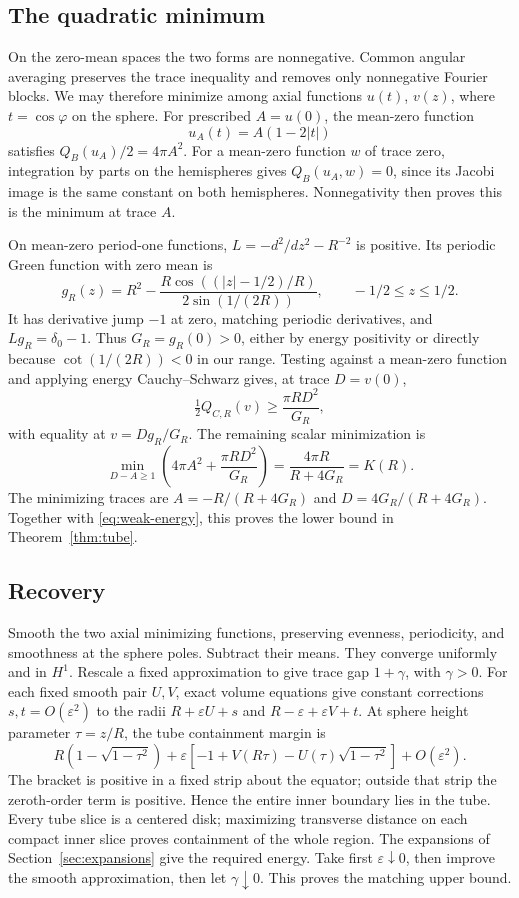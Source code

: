 \documentclass[11pt,reqno]{amsart}
\numberwithin{equation}{section}
\theoremstyle{definition}
\theoremstyle{remark}
\newcommand{\eps}{\varepsilon}
\begin{document}
\subsection{The quadratic minimum}
On the zero-mean spaces the two forms are nonnegative.
Common angular averaging preserves the trace inequality and removes
only nonnegative Fourier blocks. We may therefore minimize among
axial functions $u(t)$, $v(z)$, where $t=\cos\varphi$ on the sphere.
For prescribed $A=u(0)$, the mean-zero function
\[
 u_A(t)=A(1-2|t|)
\]
satisfies $Q_B(u_A)/2=4\pi A^2$.
For a mean-zero function $w$ of trace zero, integration by parts on
the hemispheres gives $Q_B(u_A,w)=0$, since its Jacobi image is the
same constant on both hemispheres. Nonnegativity then proves this is
the minimum at trace $A$.

On mean-zero period-one functions, $L=-d^2/dz^2-R^{-2}$ is positive.
Its periodic Green function with zero mean is
\[
 g_R(z)=R^2-\frac{R\cos((|z|-1/2)/R)}{2\sin(1/(2R))},
 \qquad -1/2\le z\le1/2.
\]
It has derivative jump $-1$ at zero, matching periodic derivatives,
and $Lg_R=\delta_0-1$. Thus $G_R=g_R(0)>0$, either by energy
positivity or directly because $\cot(1/(2R))<0$ in our range.
Testing against a mean-zero function and applying energy
Cauchy--Schwarz gives, at trace $D=v(0)$,
\[
 \tfrac12Q_{C,R}(v)\ge\frac{\pi R D^2}{G_R},
\]
with equality at $v=Dg_R/G_R$. The remaining scalar minimization is
\[
 \min_{D-A\ge1}\left(4\pi A^2+\frac{\pi R D^2}{G_R}\right)
 =\frac{4\pi R}{R+4G_R}=K(R).
\]
The minimizing traces are $A=-R/(R+4G_R)$ and
$D=4G_R/(R+4G_R)$. Together with \eqref{eq:weak-energy}, this proves
the lower bound in Theorem~\ref{thm:tube}.

\subsection{Recovery}
Smooth the two axial minimizing functions, preserving evenness,
periodicity, and smoothness at the sphere poles. Subtract their means.
They converge uniformly and in $H^1$. Rescale a fixed approximation
to give trace gap $1+\gamma$, with $\gamma>0$.
For each fixed smooth pair $U,V$, exact volume equations give constant
corrections $s,t=O(\eps^2)$ to the radii
$R+\eps U+s$ and $R-\eps+\eps V+t$.
At sphere height parameter $\tau=z/R$, the tube containment margin is
\[
 R(1-\sqrt{1-\tau^2})
 +\eps[-1+V(R\tau)-U(\tau)\sqrt{1-\tau^2}]+O(\eps^2).
\]
The bracket is positive in a fixed strip about the equator; outside
that strip the zeroth-order term is positive. Hence the entire inner
boundary lies in the tube. Every tube slice is a centered disk;
maximizing transverse distance on each compact inner slice proves
containment of the whole region. The expansions of
Section~\ref{sec:expansions} give the required energy. Take first
$\eps\downarrow0$, then improve the smooth approximation, then let
$\gamma\downarrow0$. This proves the matching upper bound.
\end{document}
